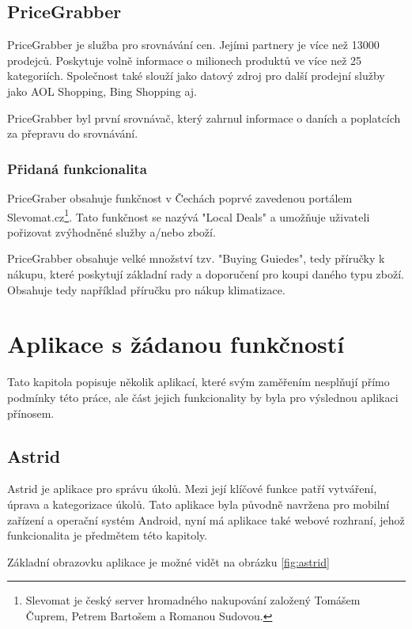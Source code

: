 \subsection{PriceGrabber}
PriceGrabber je služba pro srovnávání cen. Jejími partnery je více než 13000 prodejců. Poskytuje volně informace o milionech produktů ve více než 25 kategoriích. Společnost také slouží jako datový zdroj pro další prodejní služby jako AOL Shopping, Bing Shopping aj. \cite{website:wiki:pricegrabber}

PriceGrabber byl první srovnávač, který zahrnul informace o daních a poplatcích za přepravu do srovnávání. \cite{website:wiki:pricegrabber}

\subsubsection{Přidaná funkcionalita}
PriceGraber obsahuje funkčnost v Čechách poprvé zavedenou portálem Slevomat.cz\footnote{Slevomat je český server hromadného nakupování založený Tomášem Čuprem, Petrem Bartošem a Romanou Sudovou.}. Tato funkčnost se nazývá "Local Deals" a umožňuje uživateli pořizovat zvýhodněné služby a/nebo zboží.

PriceGrabber obsahuje velké množství tzv. "Buying Guiedes", tedy příručky k nákupu, které poskytují základní rady a doporučení pro koupi daného typu zboží. Obsahuje tedy například příručku pro nákup klimatizace.

\section{Aplikace s žádanou funkčností}
\label{sec:aplikace-s-zadanou-funkcnosti}
Tato kapitola popisuje několik aplikací, které svým zaměřením nesplňují přímo podmínky této práce, ale část jejich funkcionality by byla pro výslednou aplikaci přínosem.

\subsection{Astrid}
\label{sec:astrid}
Astrid je aplikace pro správu úkolů. Mezi její klíčové funkce patří vytváření, úprava a kategorizace úkolů. Tato aplikace byla původně navržena pro mobilní zařízení a operační systém Android, nyní má aplikace také webové rozhraní, jehož funkcionalita je předmětem této kapitoly.

Základní obrazovku aplikace je možné vidět na obrázku \ref{fig:astrid}

